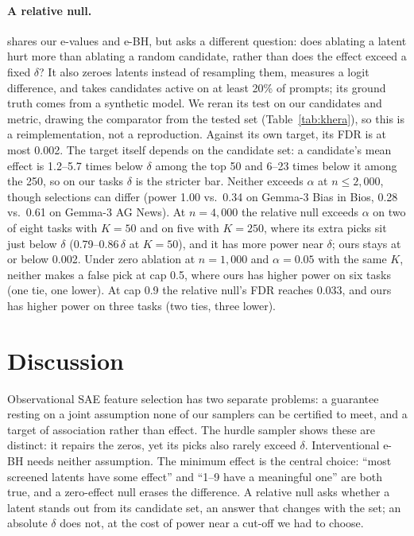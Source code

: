 \paragraph{A relative null.} \citet{khera2026} shares our e-values and e-BH, but asks a different question: does ablating a
latent hurt more than ablating a random candidate, rather than does the effect exceed a fixed $\delta$? It also zeroes latents
instead of resampling them, measures a logit difference, and takes candidates active on at least 20\% of prompts; its
ground truth comes from a synthetic model. We reran its test on our candidates and metric, drawing the comparator from the
tested set (Table~\ref{tab:khera}), so this is a reimplementation, not a reproduction. Against its own target, its FDR is at most 0.002. The target itself depends on the candidate set: a candidate's mean effect is 1.2--5.7 times below $\delta$ among the
top 50 and 6--23 times below it among the 250, so on our tasks $\delta$ is the stricter bar. Neither exceeds $\alpha$ at $n \le 2{,}000$, though selections can differ (power 1.00 vs.\ 0.34 on Gemma-3 Bias in Bios, 0.28
vs.\ 0.61 on Gemma-3 AG News). At $n = 4{,}000$ the relative null exceeds $\alpha$ on two of eight tasks with $K = 50$ and on five with $K = 250$,
where its extra picks sit just below $\delta$ (0.79--0.86$\,\delta$ at $K = 50$), and it has more power near $\delta$; ours stays at or
below 0.002. Under zero ablation at $n = 1{,}000$ and $\alpha = 0.05$ with the same $K$, neither makes a false pick at cap 0.5, where ours has higher power on six tasks (one tie, one lower). At cap 0.9 the relative null's FDR reaches 0.033, and ours has higher power on three tasks (two ties, three lower).

\FloatBarrier
\section{Discussion}
\label{sec:discussion}

Observational SAE feature selection has two separate problems: a guarantee resting on a joint assumption none of our samplers
can be certified to meet, and a target of association rather than effect. The hurdle sampler shows these are distinct: it repairs
the zeros, yet its picks also rarely exceed $\delta$. Interventional e-BH needs neither assumption. The
minimum effect is the central choice: ``most screened latents have some effect'' and ``1--9 have a meaningful one'' are both true,
and a zero-effect null erases the difference. A relative null asks whether a latent stands out from its candidate set, an answer
that changes with the set; an absolute $\delta$ does not, at the cost of power near a cut-off we had to choose.

